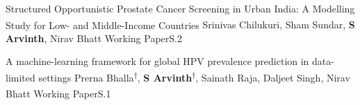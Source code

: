 
\begin{publications}
   
\publication
    {Structured Opportunistic Prostate Cancer Screening in Urban India: A Modelling Study for Low- and Middle-Income Countries}{}
    {Srinivas Chilukuri\textsuperscript{\scriptsize\Letter}, Sham Sundar, \textbf{S Arvinth}, Nirav Bhatt}
    {} {Working Paper}{\label{S2}S.2}

\publication
    {A machine-learning framework for global HPV prevalence prediction in data-limited settings}{}
    {Prerna Bhalla\textsuperscript{\scriptsize$\dagger$}, \textbf{S Arvinth}\textsuperscript{\scriptsize$\dagger$}, Sainath Raja, Daljeet Singh, Nirav Bhatt\textsuperscript{\scriptsize\Letter}}
    {} {Working Paper}{\label{S1}S.1}
\end{publications}
    





